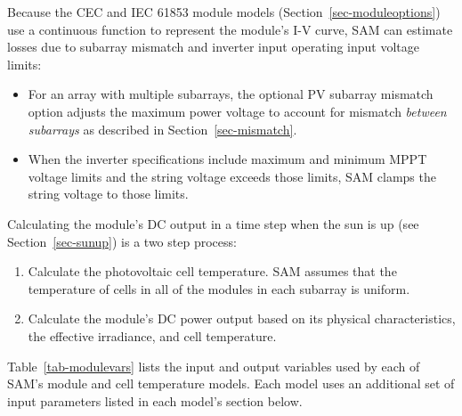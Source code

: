 \documentclass[12pt,letterpaper]{article}
\begin{document}
Because the CEC and IEC 61853 module models (Section~\ref{sec-moduleoptions}) use a continuous function to represent the module's I-V curve, SAM can estimate losses due to subarray mismatch and inverter input operating input voltage limits:
\begin{itemize}
\item For an array with multiple subarrays, the optional PV subarray mismatch option adjusts the maximum power voltage to account for mismatch \textit{between subarrays} as described in Section~\ref{sec-mismatch}.
\item When the inverter specifications include maximum and minimum MPPT voltage limits and the string voltage exceeds those limits, SAM clamps the string voltage to those limits.
\end{itemize}
Calculating the module's DC output in a time step when the sun is up (see Section~\ref{sec-sunup}) is a two step process:
\begin{enumerate}
\item Calculate the photovoltaic cell temperature. SAM assumes that the temperature of cells in all of the modules in each subarray is uniform.
\item Calculate the module's DC power output based on its physical characteristics, the effective irradiance, and cell temperature.
\end{enumerate}

Table~\ref{tab-modulevars} lists the input and output variables used by each of SAM's module and cell temperature models. Each model uses an additional set of input parameters listed in each model's section below.
\end{document}
